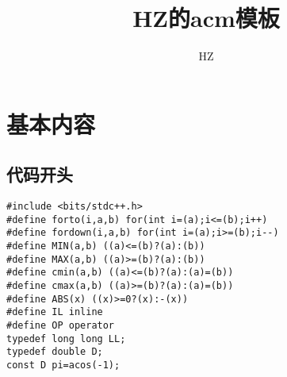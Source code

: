 \documentclass{article}
\begin{document}
\title{HZ的acm模板}
\author{HZ}
\maketitle
\tableofcontents

\section{基本内容}

\subsection{代码开头}
\begin{lstlisting}
#include <bits/stdc++.h>
#define forto(i,a,b) for(int i=(a);i<=(b);i++)
#define fordown(i,a,b) for(int i=(a);i>=(b);i--)
#define MIN(a,b) ((a)<=(b)?(a):(b))
#define MAX(a,b) ((a)>=(b)?(a):(b))
#define cmin(a,b) ((a)<=(b)?(a):(a)=(b))
#define cmax(a,b) ((a)>=(b)?(a):(a)=(b))
#define ABS(x) ((x)>=0?(x):-(x))
#define IL inline
#define OP operator
typedef long long LL;
typedef double D;
const D pi=acos(-1);
\end{lstlisting}
\end{document}
